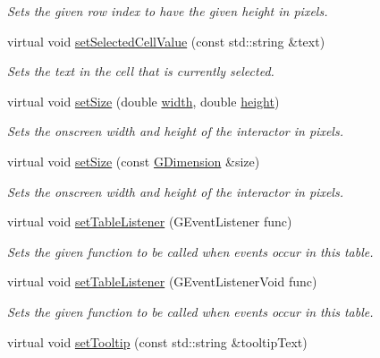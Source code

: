 \begin{DoxyCompactItemize}
\begin{DoxyCompactList}\small\item\em Sets the given row index to have the given height in pixels. \end{DoxyCompactList}\item 
virtual void \mbox{\hyperlink{classGTable_a3120b24ea5aaa17d8a7192742c00bcfb}{set\+Selected\+Cell\+Value}} (const std\+::string \&text)
\begin{DoxyCompactList}\small\item\em Sets the text in the cell that is currently selected. \end{DoxyCompactList}\item 
virtual void \mbox{\hyperlink{classGInteractor_aca25d49481f9bf5fc8f7df4c086c4ce7}{set\+Size}} (double \mbox{\hyperlink{classGTable_ad72663daf610f2a0833a2fc3d78e4fdf}{width}}, double \mbox{\hyperlink{classGTable_ad3774f6419003470f54fd495124ef51f}{height}})
\begin{DoxyCompactList}\small\item\em Sets the onscreen width and height of the interactor in pixels. \end{DoxyCompactList}\item 
virtual void \mbox{\hyperlink{classGInteractor_ae2b628228f192c2702c4ce941b2af68f}{set\+Size}} (const \mbox{\hyperlink{classGDimension}{G\+Dimension}} \&size)
\begin{DoxyCompactList}\small\item\em Sets the onscreen width and height of the interactor in pixels. \end{DoxyCompactList}\item 
virtual void \mbox{\hyperlink{classGTable_aeeb00b5caf01028e9de6f2dd6ef4b9bd}{set\+Table\+Listener}} (G\+Event\+Listener func)
\begin{DoxyCompactList}\small\item\em Sets the given function to be called when events occur in this table. \end{DoxyCompactList}\item 
virtual void \mbox{\hyperlink{classGTable_a0412cb4e079085ed5cb3bcdf2921ac84}{set\+Table\+Listener}} (G\+Event\+Listener\+Void func)
\begin{DoxyCompactList}\small\item\em Sets the given function to be called when events occur in this table. \end{DoxyCompactList}\item 
virtual void \mbox{\hyperlink{classGInteractor_a039e0e49beaecc275efce02d416acea8}{set\+Tooltip}} (const std\+::string \&tooltip\+Text)

\end{DoxyCompactItemize}
